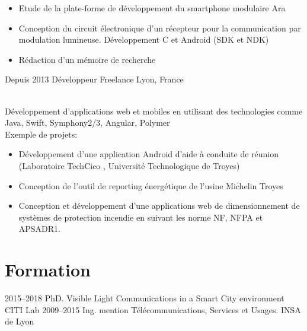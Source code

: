 \documentclass[]{cv-style}          %
\begin{document}
\begin{entrylist}
{\begin{itemize}
    \item Etude de la plate-forme de développement du smartphone modulaire Ara
    \item Conception du circuit électronique d'un récepteur pour la communication par modulation lumineuse. Développement C et Android (SDK et NDK)
	\item Rédaction d'un mémoire de recherche
  \end{itemize}}
\entry
  {Depuis 2013}
  {Développeur Freelance}
  {Lyon, France}
  {\\
  Développement d'applications web et mobiles en utilisant des technologies comme Java, Swift, Symphony2/3, Angular, Polymer\\
  Exemple de projets:
  \begin{itemize}
    \item Développement d'une application Android d'aide à conduite de réunion \\ (Laboratoire TechCico , Université Technologique de Troyes)
    \item Conception de l’outil de reporting énergétique de l'usine Michelin Troyes
    \item Conception et développement d'une applications web de dimensionnement de systèmes de protection incendie en suivant les norme NF, NFPA et APSADR1.
  \end{itemize}}
\end{entrylist}


\section{Formation}

\begin{entrylist}
\entry
{2015--2018}
{PhD. {\normalfont Visible Light Communications in a Smart City environment}}
{CITI Lab}
{}
\entry
{2009--2015}
{Ing. {\normalfont mention Télécommunications, Services et Usages.}}
{INSA de Lyon}
{ \\
}
\end{entrylist}
\end{document}

